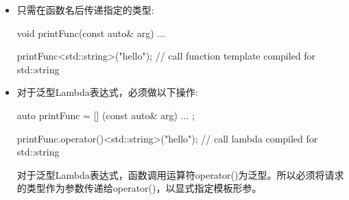 \begin{itemize}
\item
只需在函数名后传递指定的类型:

\begin{cpp}
void printFunc(const auto& arg) {
	...
}

printFunc<std::string>("hello"); // call function template compiled for std::string
\end{cpp}

\item
对于泛型Lambda表达式，必须做以下操作:

\begin{cpp}
auto printFunc = [] (const auto& arg) {
	...
};

printFunc.operator()<std::string>("hello"); // call lambda compiled for std::string
\end{cpp}

对于泛型Lambda表达式，函数调用运算符operator()为泛型。所以必须将请求的类型作为参数传递给operator()，以显式指定模板形参。
\end{itemize}






